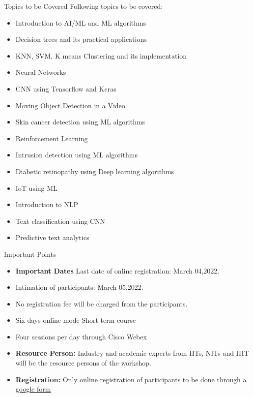 \documentclass[final]{beamer}
\newlength{\colwidth}
\begin{document}
\begin{frame}[t]
\begin{columns}[t]
\begin{column}{\colwidth}
\begin{block}{Topics to be Covered}
  Following topics to be covered:
  \begin{itemize}
  
 \item Introduction to AI/ML and ML algorithms
\item Decision trees and its practical applications

\item KNN, SVM, K means Clustering and its implementation
\item Neural Networks
\item CNN using Tensorflow and Keras
\item Moving Object Detection in a Video
\item Skin cancer detection using ML algorithms
\item Reinforcement Learning
\item Intrusion detection using ML algorithms
\item Diabetic retinopathy using Deep learning algorithms
\item IoT using ML
\item Introduction to NLP
\item Text classification using CNN
\item Predictive text analytics

\end{itemize}
  \end{block}
   \begin{alertblock}{Important Points}

    

    \begin{itemize}
      \item \textbf{Important Dates} Last date of online registration: March 04,2022.
      \item Intimation of participants: March 05,2022.

     
      \item No registration fee will be charged from the participants.
      \item Six days online mode Short term course
      \item Four sessions per day through Cisco Webex
      \item \textbf{Resource Person:}
Industry and academic experts from IITs, NITs and  IIIT will be the resource persons of the workshop. 
 \item \textbf{Registration:} Only online registration of participants to be done through a \underline{ \href{https://forms.gle/vudZyJhHLTd9Ufyt6}{google form}}\\
 

\end{itemize}
\end{alertblock}
\end{column}
\end{columns}
\end{frame}
\end{document}
